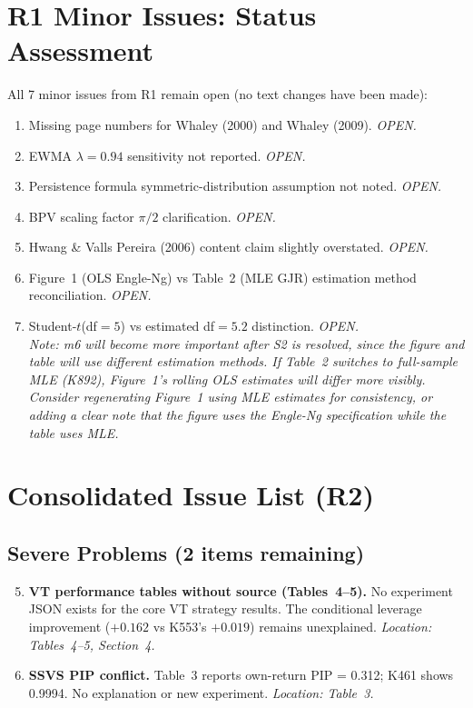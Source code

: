 \documentclass[12pt,a4paper]{article}
\begin{document}
\section*{R1 Minor Issues: Status Assessment}

All 7 minor issues from R1 remain open (no text changes have been made):

\begin{enumerate}[label=m\arabic*]
\item Missing page numbers for Whaley (2000) and Whaley (2009). \textit{OPEN.}
\item EWMA $\lambda = 0.94$ sensitivity not reported. \textit{OPEN.}
\item Persistence formula symmetric-distribution assumption not noted. \textit{OPEN.}
\item BPV scaling factor $\pi/2$ clarification. \textit{OPEN.}
\item Hwang \& Valls Pereira (2006) content claim slightly overstated. \textit{OPEN.}
\item Figure~1 (OLS Engle-Ng) vs Table~2 (MLE GJR) estimation method reconciliation. \textit{OPEN.}
\item Student-$t$(df$=5$) vs estimated df$=5.2$ distinction. \textit{OPEN.} \\
\textit{Note: m6 will become more important after S2 is resolved, since the figure and table will use different estimation methods. If Table~2 switches to full-sample MLE (K892), Figure~1's rolling OLS estimates will differ more visibly. Consider regenerating Figure~1 using MLE estimates for consistency, or adding a clear note that the figure uses the Engle-Ng specification while the table uses MLE.}
\end{enumerate}


\section*{Consolidated Issue List (R2)}

\subsection*{\textcolor{errorred}{Severe Problems (2 items remaining)}}

\begin{enumerate}[label=\textcolor{errorred}{S\arabic*}]
\setcounter{enumi}{4}

\item \textbf{VT performance tables without source (Tables~4--5).} No experiment JSON exists for the core VT strategy results. The conditional leverage improvement ($+0.162$ vs K553's $+0.019$) remains unexplained. \textit{Location: Tables~4--5, Section~4.}

\item \textbf{SSVS PIP conflict.} Table~3 reports own-return PIP = 0.312; K461 shows 0.9994. No explanation or new experiment. \textit{Location: Table~3.}

\end{enumerate}
\end{document}

